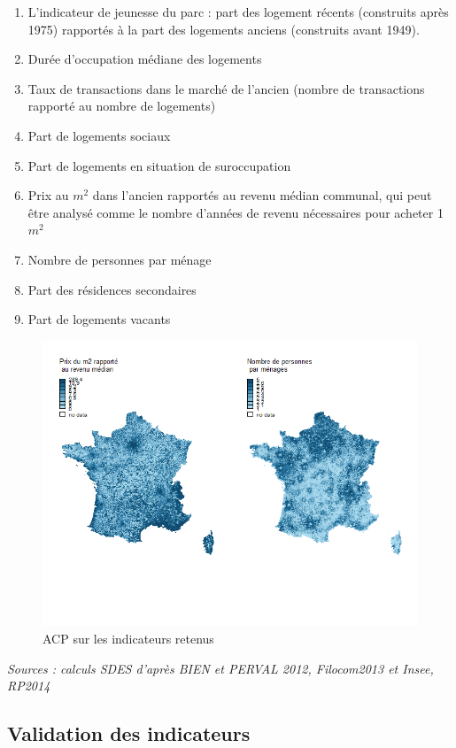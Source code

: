 \documentclass[12pt, a4paper]{article}
\begin{document}
\begin{enumerate}
\item L'indicateur de jeunesse du parc : part des logement récents (construits après 1975) rapportés à la part des logements anciens (construits avant 1949). 
\item Durée d'occupation médiane des logements
\item Taux de transactions dans le marché de l'ancien (nombre de transactions rapporté au nombre de logements)
\item Part de logements sociaux
\item Part de logements en situation de suroccupation
\item Prix au $m^2$ dans l'ancien rapportés au revenu médian communal, qui peut être analysé comme le nombre d'années de revenu nécessaires pour acheter 1 $m^2$
\item Nombre de personnes par ménage
\item Part des résidences secondaires
\item Part de logements vacants
\end{enumerate}


\begin{figure}[H]
\caption{ACP sur les indicateurs retenus}
\begin{center}
\includegraphics[scale=.8]{img/Indic_comm.png}
\end{center}
\end{figure}
\emph{Sources : calculs SDES d'après BIEN et PERVAL 2012, Filocom2013 et Insee, RP2014}
\subsection{Validation des indicateurs}
\end{document}

